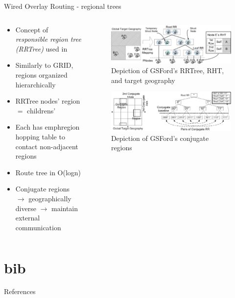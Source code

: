 \documentclass[pdftex]{beamer}
\begin{document}
\begin{frame}{Wired Overlay Routing - regional trees}
\begin{columns}
\begin{column}{.5\textwidth}
\begin{itemize}
	\item Concept of \emph{responsible region tree (RRTree)} used in \cite{6424865}
	\item Similarly to GRID, regions organized hierarchically
	\item RRTree nodes' region $=$ childrens'
	\item Each has emph{region hopping table} to contact non-adjacent regions
	\item Route tree in O(logn)
	\item Conjugate regions $\rightarrow$ geographically diverse $\rightarrow$ maintain external communication
	
\end{itemize}
\end{column}

\begin{column}{.5\textwidth}
\begin{figure}
\includegraphics[width=\textwidth]{gsford_rrtree}
\caption{Depiction of GSFord's RRTree, RHT, and target geography}
\end{figure}
\begin{figure}
\includegraphics[width=\textwidth]{gsford_conjugate_region}
\caption{Depiction of GSFord's conjugate regions}
\end{figure}
\end{column}
\end{columns}
\end{frame}


\part{bib}

\begin{frame}[allowframebreaks]{References}


\end{frame}
\end{document}
